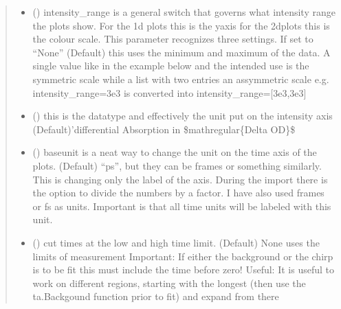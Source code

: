 \documentclass[letterpaper,10pt,english]{sphinxmanual}
\begin{document}
\begin{fulllineitems}
\begin{quote}
\begin{description}
\begin{itemize}
\item {} 
 (\sphinxstyleliteralemphasis{\sphinxupquote{, }}\sphinxstyleliteralemphasis{\sphinxupquote{ {[}}}\sphinxstyleliteralemphasis{\sphinxupquote{{]}}}) \textendash{} intensity\_range is a general switch that governs what intensity range the plots show.
For the 1d plots this is the y\sphinxhyphen{}axis for the 2d\sphinxhyphen{}plots this is the colour scale.
This parameter recognizes three settings. If set to “None” (Default) this uses the minimum and
maximum of the data. A single value like in the example below and the intended use is the symmetric
scale while a list with two entries an assymmetric scale e.g.
intensity\_range=3e\sphinxhyphen{}3 is converted into intensity\_range={[}\sphinxhyphen{}3e\sphinxhyphen{}3,3e\sphinxhyphen{}3{]}

\item {} 
 () \textendash{} this is the datatype and effectively the unit put on the intensity axis
(Default)’differential Absorption in \$mathregular\{Delta OD\}\$

\item {} 
 () \textendash{} baseunit is a neat way to change the unit on the time axis of the plots. (Default) “ps”, but they
can be frames or something similarly. This is changing only the label of the axis.
During the import there is the option to divide the numbers by a factor.
I have also used frames or fs as units. Important is that all time units will be labeled with
this unit.

\item {} 
 (\sphinxstyleliteralemphasis{\sphinxupquote{ (}}\sphinxstyleliteralemphasis{\sphinxupquote{)}}\sphinxstyleliteralemphasis{\sphinxupquote{, }}) \textendash{} cut times at the low and high time limit. (Default) None uses the limits of measurement
Important: If either the background or the chirp is to be fit this must include the
time before zero! Useful: It is useful to work on different regions, starting with
the longest (then use the ta.Backgound function prior to fit) and expand from there


\end{itemize}
\end{description}
\end{quote}
\end{fulllineitems}
\end{document}
